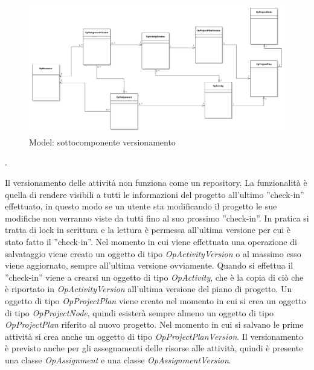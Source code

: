\begin{landscape}
\begin{figure}[H]
\begin{center}
\includegraphics[width=1.6\textwidth]{img/ModelIncremento2.png}
\caption{Model: sottocomponente versionamento}
\label{fig:Model: sottocomponente versionamento}
\end{center}
\end{figure}
\end{landscape}.

Il versionamento delle attivit\`{a} non funziona come un repository. La funzionalit\`{a} \`{e} quella di rendere visibili a tutti le informazioni del progetto all\textquoteright{}ultimo ''check-in'' effettuato, in questo modo se un utente sta modificando il progetto le sue modifiche non verranno viste da tutti fino al suo prossimo ''check-in''. In pratica si tratta di lock in scrittura e la lettura \`{e} permessa all\textquoteright{}ultima versione per cui \`{e} stato fatto il ''check-in''.
Nel momento in cui viene effettuata una operazione di salvataggio viene creato un oggetto di tipo \textit{OpActivityVersion} o al massimo esso viene aggiornato, sempre all\textquoteright{}ultima versione ovviamente. Quando si effettua il ''check-in'' viene a crearsi un oggetto di tipo \textit{OpActivity}, che \`{e} la copia di ci\`{o} che \`{e} riportato in \textit{OpActivityVersion} all\textquoteright{}ultima versione del piano di progetto.
Un oggetto di tipo \textit{OpProjectPlan} viene creato nel momento in cui si crea un oggetto di tipo \textit{OpProjectNode}, quindi esister\`{a} sempre almeno un oggetto di tipo \textit{OpProjectPlan} riferito al nuovo progetto. Nel momento in cui si salvano le prime attivit\`{a} si crea anche un oggetto di tipo \textit{OpProjectPlanVersion}. Il versionamento \`{e} previsto anche per gli assegnamenti delle risorse alle attivit\`{a}, quindi \`{e} presente una classe \textit{OpAssignment} e una classe \textit{OpAssignmentVersion}.


